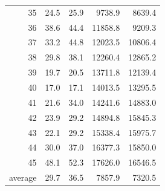 \documentclass[11pt]{article}
\begin{document}
\begin{table}[htbp]
\begin{adjustbox}{max width=1\textwidth}
\begin{tabular}{|r|rrrr|}
    35    & 24.5  & \multicolumn{1}{r|}{25.9} & 9738.9 & 8639.4 \\
    36    & 38.6  & \multicolumn{1}{r|}{44.4} & 11858.8 & 9209.3 \\
    37    & 33.2  & \multicolumn{1}{r|}{44.8} & 12023.5 & 10806.4 \\
    38    & 29.8  & \multicolumn{1}{r|}{38.1} & 12260.4 & 12865.2 \\
    39    & 19.7  & \multicolumn{1}{r|}{20.5} & 13711.8 & 12139.4 \\
    40    & 17.0  & \multicolumn{1}{r|}{17.1} & 14013.5 & 13295.5 \\
    41    & 21.6  & \multicolumn{1}{r|}{34.0} & 14241.6 & 14883.0 \\
    42    & 23.9  & \multicolumn{1}{r|}{29.2} & 14894.8 & 15845.3 \\
    43    & 22.1  & \multicolumn{1}{r|}{29.2} & 15338.4 & 15975.7 \\
    44    & 30.0  & \multicolumn{1}{r|}{37.0} & 16377.3 & 15850.0 \\
    45    & 48.1  & \multicolumn{1}{r|}{52.3} & 17626.0 & 16546.5 \\
    \midrule
    average & 29.7  & 36.5  & 7857.9 & 7320.5 \\
    \bottomrule
    \end{tabular}
    \end{adjustbox}
\end{table}
\end{document}
